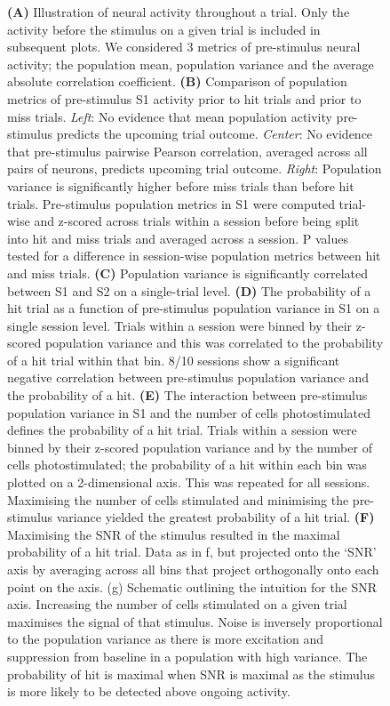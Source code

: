 \begin{figure}[h!]
{\textbf{(A)} Illustration of neural activity throughout a trial. Only the activity before the stimulus on a given trial is included in subsequent plots. We considered 3 metrics of pre-stimulus neural activity; the population mean, population variance and the average absolute correlation coefficient. \textbf{(B)} Comparison of population metrics of pre-stimulus S1 activity prior to hit trials and prior to miss trials. \textit{Left}: No evidence that mean population activity pre-stimulus predicts the upcoming trial outcome. \textit{Center}: No evidence that pre-stimulus pairwise Pearson correlation, averaged across all pairs of neurons, predicts upcoming trial outcome. \textit{Right}: Population variance is significantly higher before miss trials than before hit trials. Pre-stimulus population metrics in S1 were computed trial-wise and z-scored across trials within a session before being split into hit and miss trials and averaged across a session. P values tested for a difference in session-wise population metrics between hit and miss trials. \textbf{(C)} Population variance is significantly correlated between S1 and S2 on a single-trial level. \textbf{(D)} The probability of a hit trial as a function of pre-stimulus population variance in S1 on a single session level. Trials within a session were binned by their z-scored population variance and this was correlated to the probability of a hit trial within that bin. 8/10 sessions show a significant negative correlation between pre-stimulus population variance and the probability of a hit. \textbf{(E)} The interaction between pre-stimulus population variance in S1 and the number of cells photostimulated defines the probability of a hit trial. Trials within a session were binned by their z-scored population variance and by the number of cells photostimulated; the probability of a hit within each bin was plotted on a 2-dimensional axis. This was repeated for all sessions. Maximising the number of cells stimulated and minimising the pre-stimulus variance yielded the greatest probability of a hit trial. \textbf{(F)} Maximising the SNR of the stimulus resulted in the maximal probability of a hit trial. Data as in f, but projected onto the ‘SNR’ axis by averaging across all bins that project orthogonally onto each point on the axis. (g) Schematic outlining the intuition for the SNR axis. Increasing the number of cells stimulated on a given trial maximises the signal of that stimulus. Noise is inversely proportional to the population variance as there is more excitation and suppression from baseline in a population with high variance. The probability of hit is maximal when SNR is maximal as the stimulus is more likely to be detected above ongoing activity. 
} 
\label{fig:figure4}
\end{figure}


